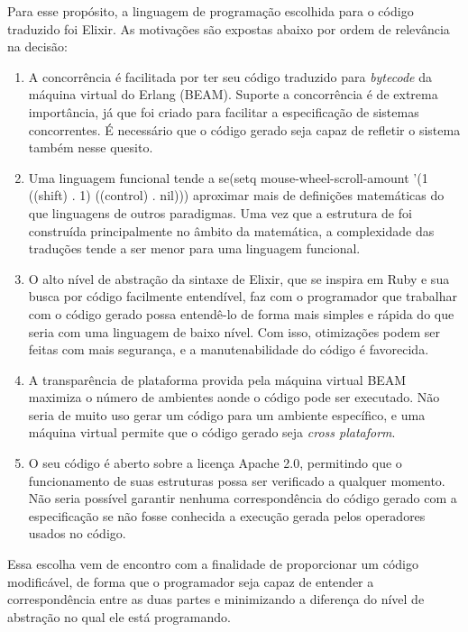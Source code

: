 Para esse propósito, a linguagem de programação escolhida para o código traduzido foi Elixir. As motivações são expostas abaixo por ordem de relevância na decisão:
\begin{enumerate}
  \item A concorrência é facilitada por ter seu código traduzido para \textit{bytecode} da máquina virtual do Erlang (BEAM). Suporte a concorrência é de extrema importância, já que \TLA foi criado para facilitar a especificação de sistemas concorrentes. É necessário que o código gerado seja capaz de refletir o sistema também nesse quesito.

  \item Uma linguagem funcional tende a se(setq mouse-wheel-scroll-amount '(1 ((shift) . 1) ((control) . nil)))  aproximar mais de definições matemáticas do que linguagens de outros paradigmas. Uma vez que a estrutura de \TLA foi construída principalmente no âmbito da matemática, a complexidade das traduções tende a ser menor para uma linguagem funcional.

  \item O alto nível de abstração da sintaxe de Elixir, que se inspira em Ruby e sua busca por código facilmente entendível, faz com o programador que trabalhar com o código gerado possa entendê-lo de forma mais simples e rápida do que seria com uma linguagem de baixo nível. Com isso, otimizações podem ser feitas com mais segurança, e a manutenabilidade do código é favorecida.

  \item A transparência de plataforma provida pela máquina virtual BEAM maximiza o número de ambientes aonde o código pode ser executado. Não seria de muito uso gerar um código para um ambiente específico, e uma máquina virtual permite que o código gerado seja \textit{cross plataform}.

  \item O seu código é aberto sobre a licença Apache 2.0, permitindo que o funcionamento de suas estruturas possa ser verificado a qualquer momento. Não seria possível garantir nenhuma correspondência do código gerado com a especificação se não fosse conhecida a execução gerada pelos operadores usados no código.

\end{enumerate}

Essa escolha vem de encontro com a finalidade de proporcionar um código modificável, de forma que o programador seja capaz de entender a correspondência entre as duas partes e minimizando a diferença do nível de abstração no qual ele está programando.

